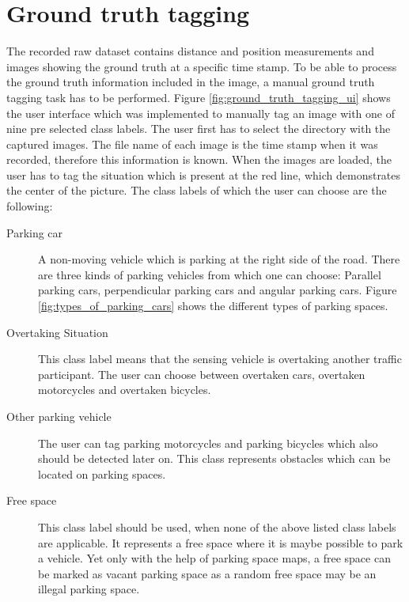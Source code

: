 \section{Ground truth tagging}

The recorded raw dataset contains distance and position measurements and images showing the ground truth at a specific time stamp. To be able to process the ground truth information included in the image, a manual ground truth tagging task has to be performed. Figure \ref{fig:ground_truth_tagging_ui} shows the user interface which was implemented to manually tag an image with one of nine pre selected class labels. The user first has to select the directory with the captured images. The file name of each image is the time stamp when it was recorded, therefore this information is known. When the images are loaded, the user has to tag the situation which is present at the red line, which demonstrates the center of the picture. 
The class labels of which the user can choose are the following:

\begin{description}

\item[Parking car] A non-moving vehicle which is parking at the right side of the road. There are three kinds of parking vehicles from which one can choose: Parallel parking cars, perpendicular parking cars and angular parking cars. Figure \ref{fig:types_of_parking_cars} shows the different types of parking spaces.

\item[Overtaking Situation] This class label means that the sensing vehicle is overtaking another traffic participant. The user can choose between overtaken cars, overtaken motorcycles and overtaken bicycles.

\item[Other parking vehicle] The user can tag parking motorcycles and parking bicycles which also should be detected later on. This class represents obstacles which can be located on parking spaces.

\item[Free space] This class label should be used, when none of the above listed class labels are applicable. It represents a free space where it is maybe possible to park a vehicle. Yet only with the help of parking space maps, a free space can be marked as vacant parking space as a random free space may be an illegal parking space.

\end{description}

